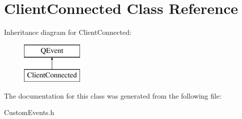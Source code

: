 \hypertarget{class_client_connected}{}\section{Client\+Connected Class Reference}
\label{class_client_connected}
Inheritance diagram for Client\+Connected\+:\begin{figure}[H]
\begin{center}
\leavevmode
\includegraphics[height=2.000000cm]{class_client_connected}
\end{center}
\end{figure}


The documentation for this class was generated from the following file\+:\begin{DoxyCompactItemize}
\item 
Custom\+Events.\+h\end{DoxyCompactItemize}

